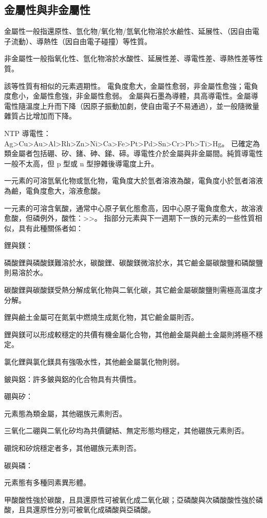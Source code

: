 \documentclass[a4paper,12pt]{article}
\begin{document}
\subsection{金屬性與非金屬性}
\bit
\item 金屬性一般指還原性、氫化物/氧化物/氫氧化物溶於水鹼性、延展性、（因自由電子流動）、導熱性（因自由電子碰撞）等性質。
\item 非金屬性一般指氧化性、氫化物溶於水酸性、延展性差、導電性差、導熱性差等性質。
\item 該等性質有相似的元素週期性。
\eit
{}
電負度愈大，金屬性愈弱，非金屬性愈強；電負度愈小，金屬性愈強，非金屬性愈弱。
金屬與石墨為導體，具高導電性。金屬導電性隨溫度上升而下降（因原子振動加劇，使自由電子不易通過），並一般隨微量雜質占比增加而下降。

NTP 導電性：Ag>Cu>Au>Al>Rh>Zn>Ni>Ca>Fe>Pt>Pd>Sn>Cr>Pb>Ti>Hg。
已確定為類金屬者包括硼、矽、鍺、砷、銻、碲。導電性介於金屬與非金屬間。純質導電性一般不太高，但 p 型或 n 型摻雜後導電度上升。
\bit
\item 一元素的可溶氫氧化物或氫化物，電負度大於氫者溶液為酸，電負度小於氫者溶液為鹼，電負度愈大，溶液愈酸。
\item 一元素的可溶含氧酸，通常中心原子氧化態愈高，因中心原子電負度愈大，故溶液愈酸，但磷例外，酸性：>>。
\eit
{}
指部分元素與下一週期下一族的元素的一些性質相似，具有此種關係者如：
\bit
\item 鋰與鎂：
\bit
\item 磷酸鋰與磷酸鎂難溶於水，碳酸鋰、碳酸鎂微溶於水，其它鹼金屬碳酸鹽和磷酸鹽則易溶於水。
\item 碳酸鋰與碳酸鎂受熱分解成氧化物與二氧化碳，其它鹼金屬碳酸鹽則需極高溫度才分解。
\item 鋰與鹼土金屬可在氮氣中燃燒生成氮化物，其它鹼金屬則否。
\item 鋰與鎂可以形成較穩定的共價有機金屬化合物，其他鹼金屬與鹼土金屬則將極不穩定。
\item 氯化鋰與氯化鎂具有強吸水性，其他鹼金屬氯化物則弱。
\eit
\item 鈹與鋁：許多鈹與鋁的化合物具有共價性。
\item 硼與矽：
\bit
\item 元素態為類金屬，其他硼族元素則否。
\item 三氧化二硼與二氧化矽均為共價鍵結、無定形態均穩定，其他硼族元素則否。
\item 硼烷和矽烷穩定者多，其他硼族元素則否。
\eit
\item 碳與磷：
\bit
\item 元素態有多種同素異形體。
\item 甲酸酸性強於碳酸，且具還原性可被氧化成二氧化碳；亞磷酸與次磷酸酸性強於磷酸，且具還原性分別可被氧化成磷酸與亞磷酸。
\eit
\eit
\end{document}
